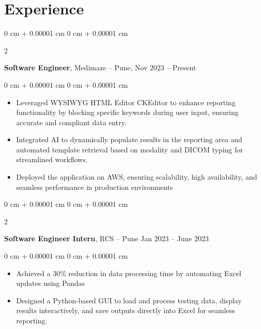 \documentclass[10pt, letterpaper]{article}
\newenvironment{highlights}{
    \begin{itemize}[
        topsep=0.10 cm,
        parsep=0.10 cm,
        partopsep=0pt,
        itemsep=0pt,
        leftmargin=0 cm + 10pt
    ]
}{
    \end{itemize}
} %
\newenvironment{onecolentry}{
    \begin{adjustwidth}{
        0 cm + 0.00001 cm
    }{
        0 cm + 0.00001 cm
    }
}{
    \end{adjustwidth}
} %
\newenvironment{twocolentry}[2][]{
    \onecolentry
    \def\secondColumn{#2}
    \setcolumnwidth{\fill, 4.5 cm}
    \begin{paracol}{2}
}{
    \switchcolumn \raggedleft \secondColumn
    \end{paracol}
    \endonecolentry
} %
\begin{document}
    \section{Experience}

        
        \begin{twocolentry}{
            Nov 2023 – Present
        }
            \textbf{Software Engineer}, Medimaze -- Pune, \end{twocolentry}

        \vspace{0.10 cm}
        \begin{onecolentry}
            \begin{highlights}
                \item Leveraged WYSIWYG HTML Editor CKEditor to enhance reporting functionality by blocking specific keywords during user input, ensuring accurate and compliant data entry.
                \item Integrated AI to dynamically populate results in the reporting area and automated template retrieval based on modality and DICOM typing for streamlined workflows.
                \item Deployed the application on AWS, ensuring scalability, high availability, and seamless performance in production environments
            \end{highlights}
        \end{onecolentry}


        \vspace{0.2 cm}

        \begin{twocolentry}{
            Jan 2023 – June 2023
        }
            \textbf{Software Engineer Intern}, RCS -- Pune\end{twocolentry}

        \vspace{0.10 cm}
        \begin{onecolentry}
            \begin{highlights}
                \item Achieved a 30\% reduction in data processing time by automating Excel updates using Pandas 
                \item Designed a Python-based GUI to load and process testing data, display results interactively, and save outputs directly into Excel for seamless reporting.
            \end{highlights}
        \end{onecolentry}
\end{document}
